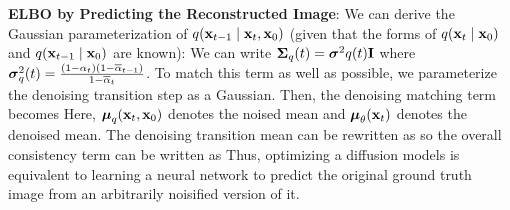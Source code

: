 \documentclass{article}
\begin{document}
  \textbf{ELBO by Predicting the Reconstructed Image}: We can derive the Gaussian parameterization of $q(\mathbf{x}_{t-1}\mid \mathbf{x}_t,\mathbf{x}_0)$ (given that the forms of $q(\mathbf{x}_t\mid \mathbf{x}_0)$ and $q(\mathbf{x}_{t-1}\mid \mathbf{x}_0)$ are known):
  We can write $\boldsymbol{\Sigma}_q(t)=\boldsymbol{\sigma}^2q(t)\mathbf{I}$ where $\boldsymbol{\sigma}^2_q(t)=\frac{(1-\alpha_t)(1-\overline{\alpha}_{t-1})}{1-\overline{\alpha}_t}$. To match this term as well as possible, we parameterize the denoising transition step as a Gaussian. Then, the denoising matching term becomes
  Here, $\boldsymbol{\mu}_q(\mathbf{x}_t,\mathbf{x}_0)$ denotes the noised mean and $\boldsymbol{\mu}_\theta(\mathbf{x}_t)$ denotes the denoised mean. The denoising transition mean can be rewritten as
  so the overall consistency term can be written as
  Thus, optimizing a diffusion models is equivalent to learning a neural network to predict the original ground truth image from an arbitrarily noisified version of it.
\end{document}
